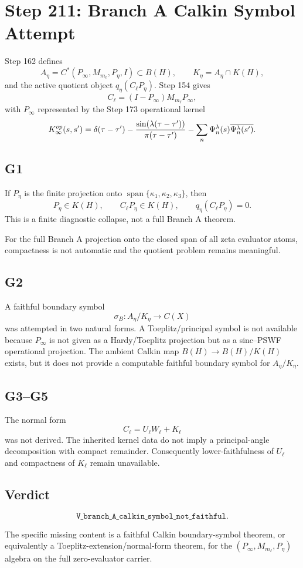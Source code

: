\documentclass[11pt]{article}
\begin{document}
\section*{Step 211: Branch A Calkin Symbol Attempt}

Step 162 defines
\[
  A_\eta=C^*(P_\infty,M_{m_\ell},P_\eta,I)\subset B(H),
  \qquad K_\eta=A_\eta\cap K(H),
\]
and the active quotient object \(q_\eta(C_\ell P_\eta)\).  Step 154 gives
\[
  C_\ell=(I-P_\infty)M_{m_\ell}P_\infty,
\]
with \(P_\infty\) represented by the Step 173 operational kernel
\[
K_\infty^{op}(s,s')=\delta(\tau-\tau')-
{\sin(\lambda(\tau-\tau'))\over \pi(\tau-\tau')}
-\sum_n\Psi_n^\lambda(s)\overline{\Psi_n^\lambda(s')}.
\]

\subsection*{G1}

If \(P_\eta\) is the finite projection onto
\(\operatorname{span}\{\kappa_1,\kappa_2,\kappa_3\}\), then
\[
P_\eta\in K(H),\qquad C_\ell P_\eta\in K(H),
\qquad q_\eta(C_\ell P_\eta)=0.
\]
This is a finite diagnostic collapse, not a full Branch A theorem.

For the full Branch A projection onto the closed span of all zeta evaluator
atoms, compactness is not automatic and the quotient problem remains meaningful.

\subsection*{G2}

A faithful boundary symbol
\[
\sigma_B:A_\eta/K_\eta\to C(X)
\]
was attempted in two natural forms.  A Toeplitz/principal symbol is not
available because \(P_\infty\) is not given as a Hardy/Toeplitz projection but
as a sinc--PSWF operational projection.  The ambient Calkin map
\(B(H)\to B(H)/K(H)\) exists, but it does not provide a computable faithful
boundary symbol for \(A_\eta/K_\eta\).

\subsection*{G3--G5}

The normal form
\[
C_\ell=U_\ell W_\ell+K_\ell
\]
was not derived.  The inherited kernel data do not imply a principal-angle
decomposition with compact remainder.  Consequently lower-faithfulness of
\(U_\ell\) and compactness of \(K_\ell\) remain unavailable.

\subsection*{Verdict}

\[
\boxed{\texttt{V\_branch\_A\_calkin\_symbol\_not\_faithful}.}
\]

The specific missing content is a faithful Calkin boundary-symbol theorem, or
equivalently a Toeplitz-extension/normal-form theorem, for the
\((P_\infty,M_{m_\ell},P_\eta)\) algebra on the full zero-evaluator carrier.
\end{document}
